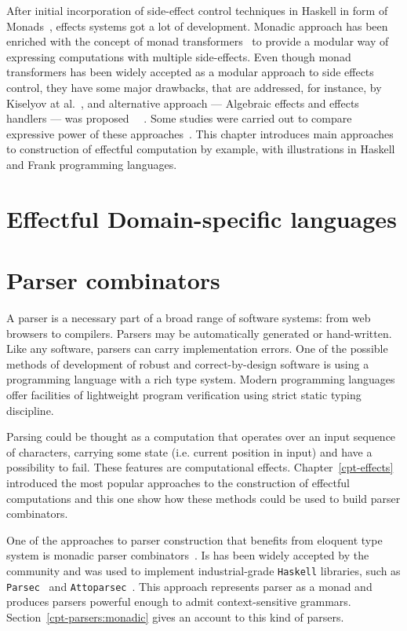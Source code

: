 After initial incorporation of side-effect control techniques in Haskell in
form of Monads~\cite{Wadler:1992:EFP:143165.143169}, effects systems got a lot
of development. Monadic approach has been enriched with the concept of monad
transformers~\cite{Liang:1995:MTM:199448.199528} to provide a modular way of
expressing computations with multiple side-effects. Even though monad
transformers has been widely accepted as a modular approach to side effects control,
they have some major drawbacks, that are addressed, for instance, by Kiselyov at al.~\cite{Kiselyov:2013:EEA:2578854.2503791}, and alternative approach --- Algebraic effects and effects handlers --- was proposed~\cite{DBLP:journals/jlp/BauerP15}
~\cite{Kiselyov:2013:EEA:2578854.2503791}. Some studies were carried out to
compare expressive power of these approaches~\cite{DBLP:journals/corr/ForsterKLP16}.
This chapter introduces main approaches to construction of effectful computation
by example, with illustrations in Haskell and Frank programming languages.

\section{Effectful Domain-specific languages}

\section{Parser combinators}

A parser is a necessary part of a broad range of software systems: from web browsers
to compilers. Parsers may be automatically generated or hand-written. Like any
software, parsers can carry implementation errors. One of the possible
methods of development of robust and correct-by-design software is using a programming
language with a rich type system. Modern programming languages offer facilities of
lightweight program verification using strict static typing discipline.

Parsing could be thought as a computation that operates over an input sequence of
characters, carrying some state (i.e. current position in input) and have a
possibility to fail. These features are computational effects. Chapter~\ref{cpt-effects}
introduced the most popular approaches to the construction of effectful computations and
this one show how these methods could be used to build parser combinators.

One of the approaches to parser construction that benefits from eloquent type system
is monadic parser combinators~\cite{monParsing}. Is has been widely accepted by the
community and was used to implement industrial-grade \texttt{Haskell} libraries, such
as \texttt{Parsec}~\cite{parsec} and \texttt{Attoparsec}~\cite{attoparsec}. This
approach represents parser as a monad and produces parsers powerful enough to admit
context-sensitive grammars. Section~\ref{cpt-parsers:monadic} gives an account to this kind of parsers.

